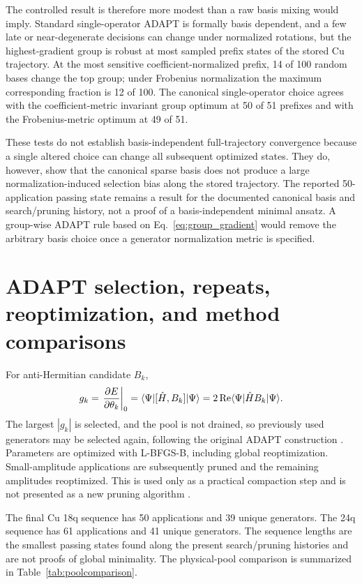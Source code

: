 \documentclass[
 aip,
 jcp,
 amsmath,amssymb,
 preprint
]{revtex4-2}
\begin{document}
The controlled result is therefore more modest than a raw basis mixing would imply.
Standard single-operator ADAPT is formally basis dependent, and a few late or near-degenerate decisions can change under normalized rotations, but the highest-gradient group is robust at most sampled prefix states of the stored Cu trajectory.
At the most sensitive coefficient-normalized prefix, 14 of 100 random bases change the top group; under Frobenius normalization the maximum corresponding fraction is 12 of 100.
The canonical single-operator choice agrees with the coefficient-metric invariant group optimum at 50 of 51 prefixes and with the Frobenius-metric optimum at 49 of 51.

These tests do not establish basis-independent full-trajectory convergence because a single altered choice can change all subsequent optimized states.
They do, however, show that the canonical sparse basis does not produce a large normalization-induced selection bias along the stored trajectory.
The reported 50-application passing state remains a result for the documented canonical basis and search/pruning history, not a proof of a basis-independent minimal ansatz.
A group-wise ADAPT rule based on Eq.~\ref{eq:group_gradient} would remove the arbitrary basis choice once a generator normalization metric is specified.

\section{ADAPT selection, repeats, reoptimization, and method comparisons}

For anti-Hermitian candidate $B_k$,
\begin{equation}
g_k
=
\left.\frac{\partial E}{\partial\theta_k}\right|_0
=
\langle\Psi|[\hat H,B_k]|\Psi\rangle
=
2\,{\rm Re}\langle\Psi|\hat H B_k|\Psi\rangle.
\end{equation}
The largest $|g_k|$ is selected, and the pool is not drained, so previously used generators may be selected again, following the original ADAPT construction \cite{grimsley2019adapt}.
Parameters are optimized with L-BFGS-B, including global reoptimization.
Small-amplitude applications are subsequently pruned and the remaining amplitudes reoptimized. This is used only as a practical compaction step and is not presented as a new pruning algorithm \cite{vaquero2025pruned}.

The final Cu 18q sequence has 50 applications and 39 unique generators.
The 24q sequence has 61 applications and 41 unique generators.
The sequence lengths are the smallest passing states found along the present search/pruning histories and are not proofs of global minimality.
The physical-pool comparison is summarized in Table~\ref{tab:poolcomparison}.
\end{document}
